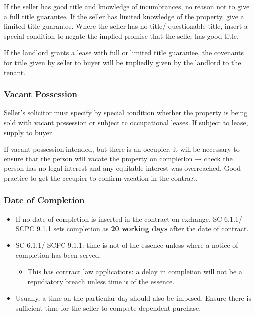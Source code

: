 \documentclass[
]{article}
\providecommand{\tightlist}{%
  \setlength{\itemsep}{0pt}\setlength{\parskip}{0pt}}
\begin{document}
If the seller has good title and knowledge of incumbrances, no reason
not to give a full title guarantee. If the seller has limited knowledge
of the property, give a limited title guarantee. Where the seller has no
title/ questionable title, insert a special condition to negate the
implied promise that the seller has good title.

If the landlord grants a lease with full or limited title guarantee, the
covenants for title given by seller to buyer will be impliedly given by
the landlord to the tenant.

\hypertarget{vacant-possession}{%
\subsubsection{Vacant Possession}\label{vacant-possession}}

Seller's solicitor must specify by special condition whether the
property is being sold with vacant possession or subject to occupational
leases. If subject to lease, supply to buyer.

If vacant possession intended, but there is an occupier, it will be
necessary to ensure that the person will vacate the property on
completion → check the person has no legal interest and any equitable
interest was overreached. Good practice to get the occupier to confirm
vacation in the contract.

\hypertarget{date-of-completion}{%
\subsubsection{Date of Completion}\label{date-of-completion}}

\begin{itemize}
\tightlist
\item
  If no date of completion is inserted in the contract on exchange, SC
  6.1.1/ SCPC 9.1.1 sets completion as \textbf{20 working days} after
  the date of contract.
\item
  SC 6.1.1/ SCPC 9.1.1: time is not of the essence unless where a notice
  of completion has been served.

  \begin{itemize}
  \tightlist
  \item
    This has contract law applications: a delay in completion will not
    be a repudiatory breach unless time is of the essence.
  \end{itemize}
\item
  Usually, a time on the particular day should also be imposed. Ensure
  there is sufficient time for the seller to complete dependent
  purchase.
\end{itemize}
\end{document}
